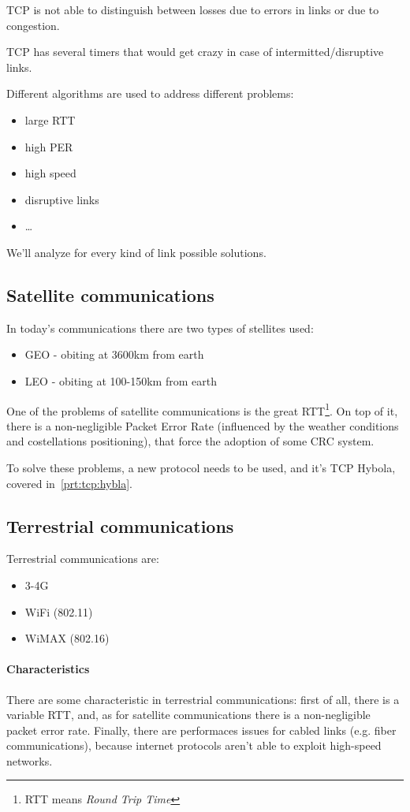 TCP is not able to distinguish between losses due to errors in links or due
to congestion.

TCP has several timers that would get crazy in case of intermitted/disruptive
links.

Different algorithms are used to address different problems:

\begin{itemize}
  \item large RTT
  \item high PER
  \item high speed
  \item disruptive links
  \item \dots
\end{itemize}

We'll analyze for every kind of link possible solutions.

\subsection{Satellite communications}
In today's communications there are two types of stellites used:
\begin{itemize}
\item GEO - obiting at 3600km from earth
\item LEO - obiting at 100-150km from earth
\end{itemize}
One of the problems of satellite communications is the great RTT\footnote{RTT
  means \textit{Round Trip Time}}. On top of it, there is a non-negligible
Packet Error Rate (influenced by the weather conditions and costellations
positioning), that force the adoption of some CRC system.

To solve these problems, a new protocol needs to be used, and it's TCP Hybola,
covered in~\ref{prt:tcp:hybla}.

\subsection{Terrestrial communications}
Terrestrial communications are:
\begin{itemize}
\item 3-4G
\item WiFi (802.11) 
\item WiMAX (802.16)
\end{itemize}

\paragraph*{Characteristics} There are some characteristic in terrestrial
communications: first of all, there is a variable RTT, and, as for satellite
communications there is a non-negligible packet error rate. Finally, there are
performaces issues for cabled links (e.g. fiber communications), because
internet protocols aren't able to exploit high-speed networks.

